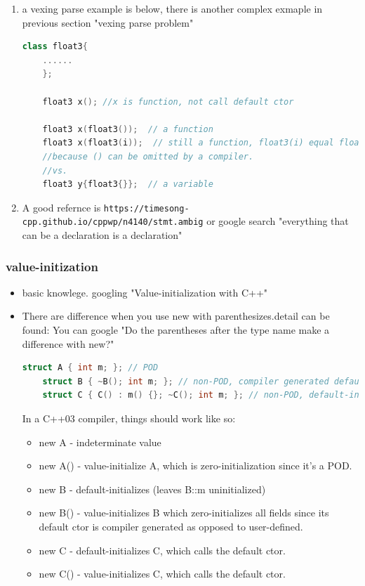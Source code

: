 \documentclass[a4paper,12pt,twoside]{book}
\begin{document}
\begin{enumerate}
	\item a vexing parse example is below, there is another complex exmaple in previous section "vexing parse problem"
	\begin{lstlisting}[frame=single, language=c++]
	class float3{
	......
	};
	
	float3 x(); //x is function, not call default ctor
	
	float3 x(float3());  // a function
	float3 x(float3(i));  // still a function, float3(i) equal float3 i;
	//because () can be omitted by a compiler. 
	//vs.
	float3 y{float3{}};  // a variable
	\end{lstlisting}
	
	\item A good refernce is \verb|https://timesong-cpp.github.io/cppwp/n4140/stmt.ambig| or google search 
	"everything that can be a declaration is a declaration" 
\end{enumerate}



\subsubsection{value-initization}
\begin{itemize}
	\item basic knowlege. googling "Value-initialization with C++"
	
	\item There are difference when you use new with parenthesizes.detail can be found:
	You can google "Do the parentheses after the type name make a difference with new?"
	
	\begin{lstlisting}[frame=single, language=c++]
	struct A { int m; }; // POD
	struct B { ~B(); int m; }; // non-POD, compiler generated default ctor
	struct C { C() : m() {}; ~C(); int m; }; // non-POD, default-initialising m
	\end{lstlisting}
	
	In a C++03 compiler, things should work like so:
	\begin{itemize}
		\item new A - indeterminate value
		\item new A() - value-initialize A, which is zero-initialization since it's a POD.
		
		\item new B - default-initializes (leaves B::m uninitialized)
		
		\item new B() - value-initializes B which zero-initializes all fields since its default ctor is compiler generated as opposed to user-defined.
		
		\item new C - default-initializes C, which calls the default ctor.
		
		\item new C() - value-initializes C, which calls the default ctor.
	\end{itemize}
\end{itemize}
\end{document}
